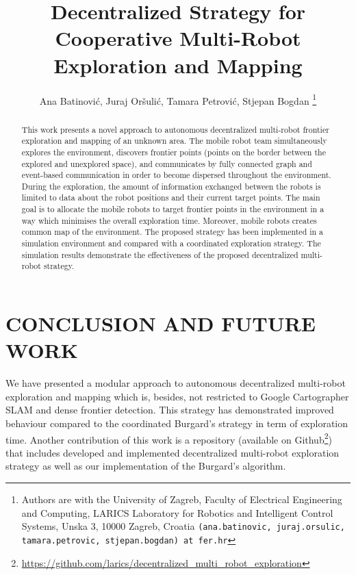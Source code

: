 \documentclass[letterpaper, 10 pt, conference]{ieeeconf}  %
\title{\LARGE \bf
Decentralized Strategy for Cooperative Multi-Robot Exploration and Mapping
}
\author{Ana Batinovi\'{c}, Juraj Or\v{s}uli\'{c}, Tamara Petrovi\'{c}, Stjepan Bogdan
	\thanks{Authors are with the University of Zagreb, Faculty of Electrical Engineering  and Computing, LARICS Laboratory for Robotics and Intelligent Control Systems, Unska 3, 10000 Zagreb, Croatia
        {\tt\small (ana.batinovic, juraj.orsulic, tamara.petrovic, stjepan.bogdan) at fer.hr}}}
\begin{document}
\maketitle

\thispagestyle{empty}
\pagestyle{empty}


\begin{abstract}

This work presents a novel approach to autonomous decentralized multi-robot frontier exploration and mapping of an unknown area.  The mobile robot team simultaneously explores the environment, discovers frontier points (points on the border between the explored and unexplored space), and communicates by fully connected graph and event-based communication in order to become dispersed throughout the environment. During the exploration, the amount of information exchanged between the robots is limited to data about the robot positions and their current target points. The main goal is to allocate the mobile robots to target frontier points in the environment in a way which minimises the overall exploration time. Moreover, mobile robots creates common map of the environment. The proposed strategy has been implemented in a simulation environment and compared with a coordinated exploration strategy. The simulation results demonstrate the effectiveness of the proposed decentralized multi-robot strategy.

\end{abstract}





\section{CONCLUSION AND FUTURE WORK}
We have presented a modular approach to autonomous decentralized multi-robot exploration and  mapping which is, besides, not restricted to Google Cartographer SLAM and dense frontier detection. This strategy has demonstrated improved behaviour compared to the coordinated Burgard's strategy in term of exploration time. Another contribution of this work is a repository (available on Github\footnote{\href{https://github.com/larics/decentralized_multi_robot_exploration}{https://github.com/larics/decentralized\_multi\_robot\_exploration}}) that includes developed and implemented decentralized multi-robot exploration strategy as well as our implementation of the Burgard's algorithm. 
\end{document}

